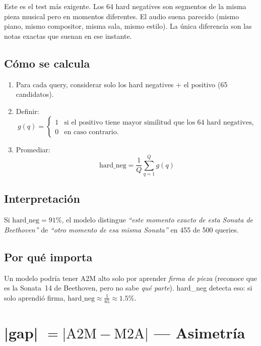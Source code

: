 \documentclass[11pt,a4paper]{article}
\newcommand{\metrica}[1]{\textbf{\textsf{#1}}}
\begin{document}
Este es el test m\'as exigente.
Los 64 hard negatives son segmentos de la misma pieza musical
pero en momentos diferentes.
El audio suena parecido
(mismo piano, mismo compositor, misma sala, mismo estilo).
La \'unica diferencia son las notas exactas que suenan en ese instante.

\subsection*{C\'omo se calcula}

\begin{enumerate}[nosep]
  \item Para cada query, considerar solo los hard negatives $+$ el positivo
        (65 candidatos).
  \item Definir:
    \[
      g(q) =
      \begin{cases}
        1 & \text{si el positivo tiene mayor similitud que los 64 hard negatives,} \\
        0 & \text{en caso contrario.}
      \end{cases}
    \]
  \item Promediar:
    \[
      \boxed{\;\text{hard\_neg} = \frac{1}{Q}\sum_{q=1}^{Q} g(q)\;}
    \]
\end{enumerate}

\subsection*{Interpretaci\'on}

Si $\text{hard\_neg} = 91\%$, el modelo distingue
\emph{``este momento exacto de esta Sonata de Beethoven''}
de \emph{``otro momento de esa misma Sonata''}
en 455 de 500 queries.

\subsection*{Por qu\'e importa}

Un modelo podr\'ia tener A2M alto solo por aprender
\emph{firma de pieza}
(reconoce que es la Sonata~14 de Beethoven,
pero no sabe \emph{qu\'e parte}).
hard\_neg detecta eso:
si solo aprendi\'o firma,
$\text{hard\_neg} \approx \frac{1}{65} \approx 1.5\%$.

\section{\metrica{|gap|} $= |\text{A2M} - \text{M2A}|$ --- Asimetr\'ia}
\end{document}
